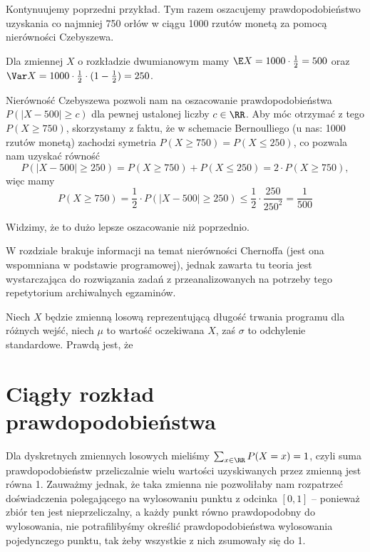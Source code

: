 \begin{example}
    Kontynuujemy poprzedni przykład. Tym razem oszacujemy prawdopodobieństwo uzyskania co najmniej 750 orłów w ciągu 1000 rzutów monetą za pomocą nierówności Czebyszewa.

    Dla zmiennej $X$ o rozkładzie dwumianowym mamy $\E X = 1000 \cdot \frac{1}{2} = 500$ oraz $\Var X = 1000 \cdot \frac{1}{2} \cdot (1 - \frac{1}{2}) = 250$.
    
    Nierówność Czebyszewa pozwoli nam na oszacowanie prawdopodobieństwa $P(|X - 500| \geq c)$ dla pewnej ustalonej liczby $c \in \RR$. Aby móc otrzymać z tego $P(X \geq 750)$, skorzystamy z faktu, że w schemacie Bernoulliego (u nas: 1000 rzutów monetą) zachodzi symetria $P(X \geq 750) = P(X \leq 250)$, co pozwala nam uzyskać równość
    $$P(|X - 500| \geq 250) = P(X \geq 750) + P(X \leq 250) = 2 \cdot P(X \geq 750),$$
    więc mamy
    $$
    P(X \geq 750) = \frac{1}{2} \cdot P(|X - 500| \geq 250) \leq \frac{1}{2} \cdot \frac{250}{250^2} = \frac{1}{500}
    $$
    
    Widzimy, że to dużo lepsze oszacowanie niż poprzednio.
\end{example}

\begin{editorsnote}
    W rozdziale brakuje informacji na temat nierówności Chernoffa (jest ona wspomniana w podstawie programowej), jednak zawarta tu teoria jest wystarczająca do rozwiązania zadań z przeanalizowanych na potrzeby tego repetytorium archiwalnych egzaminów.
\end{editorsnote}

\begin{problems}
    \prob Niech $X$ będzie zmienną losową reprezentującą długość trwania programu dla różnych wejść, niech $\mu$ to wartość oczekiwana $X$, zaś $\sigma$ to odchylenie standardowe. Prawdą jest, że
\end{problems}

\section{Ciągły rozkład prawdopodobieństwa}

Dla dyskretnych zmiennych losowych mieliśmy $\sum_{x \in \RR} P(X = x) = 1$, czyli suma prawdopodobieństw przeliczalnie wielu wartości uzyskiwanych przez zmienną jest równa 1. Zauważmy jednak, że taka zmienna nie pozwoliłaby nam rozpatrzeć doświadczenia polegającego na wylosowaniu punktu z odcinka $[0, 1]$ -- ponieważ zbiór ten jest nieprzeliczalny, a każdy punkt równo prawdopodobny do wylosowania, nie potrafilibyśmy określić prawdopodobieństwa wylosowania pojedynczego punktu, tak żeby wszystkie z nich zsumowały się do 1.

